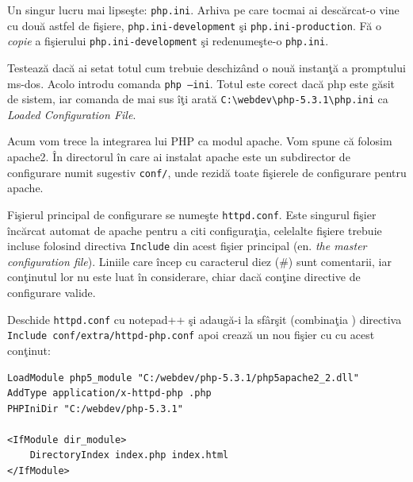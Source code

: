 
Un singur lucru mai lipseşte: \texttt{php.ini}. Arhiva pe care tocmai
ai descărcat-o vine cu două astfel de fişiere, \texttt{php.ini-development} şi
\texttt{php.ini-production}. Fă o \textit{copie} a fişierului
\texttt{php.ini-development} şi redenumeşte-o \texttt{php.ini}.

Testează dacă ai setat totul cum trebuie deschizând o nouă instanţă
a promptului ms-dos.
Acolo introdu comanda \texttt{php --ini}.
Totul este corect dacă php este găsit de sistem, iar comanda de mai sus îţi
arată \texttt{C:{\textbackslash}webdev{\textbackslash}php-5.3.1{\textbackslash}php.ini}
ca \textit{Loaded Configuration File}.


\vspace{1em}

Acum vom trece la integrarea lui PHP ca modul apache. Vom spune că folosim
apache2. În directorul în care ai instalat apache este un subdirector de configurare
numit sugestiv \texttt{conf/}, unde rezidă toate fişierele de configurare
pentru apache.

Fişierul principal de configurare se numeşte \texttt{httpd.conf}. Este singurul
fişier încărcat automat de apache pentru a citi configuraţia, celelalte fişiere
trebuie incluse folosind directiva \texttt{Include} din acest fişier
principal (en. \textsl{the master configuration file}). Liniile care încep
cu caracterul diez (\#) sunt comentarii, iar conţinutul lor nu este luat
în considerare, chiar dacă conţine directive de configurare valide.

Deschide \texttt{httpd.conf} cu notepad++ şi adaugă-i la sfârşit
(combinaţia ) directiva
\texttt{Include conf/extra/httpd-php.conf}
apoi crează un nou fişier cu  cu acest conţinut:
\begin{verbatim}
LoadModule php5_module "C:/webdev/php-5.3.1/php5apache2_2.dll"
AddType application/x-httpd-php .php
PHPIniDir "C:/webdev/php-5.3.1"

<IfModule dir_module>
    DirectoryIndex index.php index.html
</IfModule>
\end{verbatim}

